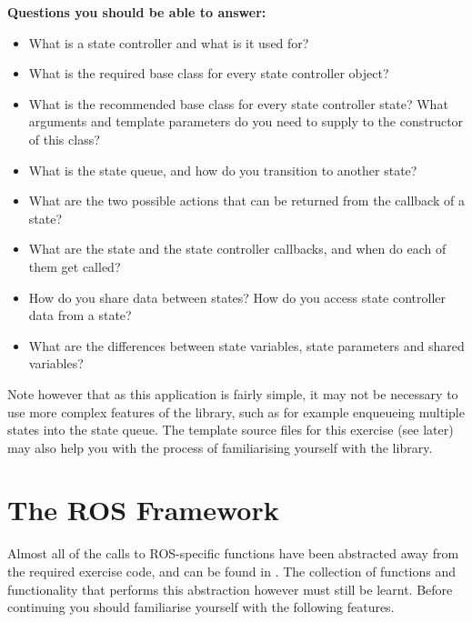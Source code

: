 \documentclass[runningheads,a4paper,obeyspaces]{llncs}
\newcommand{\code}[1]{\protect\path{#1}}
\begin{document}
\noindent\textbf{Questions you should be able to answer:}
\begin{itemize}
\setlength{\itemsep}{5pt}
\item What is a state controller and what is it used for?
\item What is the required base class for every state controller object?
\item What is the recommended base class for every state controller state? What
arguments and template parameters do you need to supply to the constructor of
this class?
\item What is the state queue, and how do you transition to another state?
\item What are the two possible actions that can be returned from the
\code{execute()} callback of a state?
\item What are the state and the state controller callbacks, and when do each of
them get called?
\item How do you share data between states? How do you access state controller
data from a state?
\item What are the differences between state variables, state parameters and
shared variables?
\end{itemize}

\noindent Note however that as this application is fairly simple, it may not be
necessary to use more complex features of the library, such as for example
enqueueing multiple states into the state queue. The template source files for
this exercise (see later) may also help you with the process of familiarising
yourself with the library.

%
\section{The ROS Framework}

Almost all of the calls to ROS-specific functions have been abstracted away from
the required exercise code, and can be found in \code{behaviour_exercise.cpp}.
The collection of functions and functionality that performs this abstraction
however must still be learnt. Before continuing you should familiarise yourself
with the following features.\\
\end{document}
